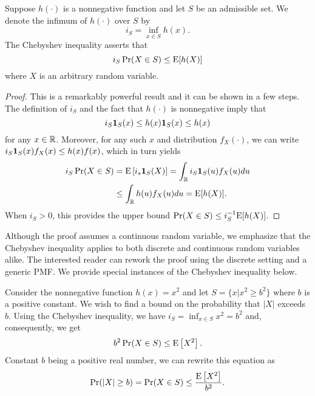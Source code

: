 \begin{proposition}
Suppose $h (\cdot)$ is a nonnegative function and let $S$ be an admissible set.
We denote the infimum of $h (\cdot)$ over $S$ by
\begin{equation*}
i_S = \inf_{ x \in S } h (x) .
\end{equation*}
The Chebyshev inequality asserts that
\begin{equation} \label{equation:ChebyshevInequality}
i_S \Pr (X \in S)
\leq \mathrm{E} [ h(X) ]
\end{equation}
where $X$ is an arbitrary random variable.
\end{proposition}
\begin{proof}
This is a remarkably powerful result and it can be shown in a few steps.
The definition of $i_S$ and the fact that $h (\cdot)$ is nonnegative imply that
\begin{equation*}
i_S \mathbf{1}_S (x) \leq h(x) \mathbf{1}_S (x) \leq h(x)
\end{equation*}
for any $x \in \mathbb{R}$.
Moreover, for any such $x$ and distribution $f_X(\cdot)$, we can write $i_S \mathbf{1}_S (x) f_X(x) \leq h(x) f(x)$, which in turn yields
\begin{equation*}
\begin{split}
i_S \Pr (X \in S) &= \mathrm{E} \left[ i_s \mathbf{1}_S (X) \right]
= \int_{\mathbb{R}} i_S \mathbf{1}_S (u) f_X(u) du \\
&\leq \int_{\mathbb{R}} h (u) f_X(u) du
= \mathrm{E} [ h(X) ] .
\end{split}
\end{equation*}
When $i_S > 0$, this provides the upper bound $\Pr (X \in S) \leq i_S^{-1} \mathrm{E} [h (X)]$.
\end{proof}

Although the proof assumes a continuous random variable, we emphasize that the Chebyshev inequality applies to both discrete and continuous random variables alike.
The interested reader can rework the proof using the discrete setting and a generic PMF.
We provide special instances of the Chebyshev inequality below.

\begin{example}
Consider the nonnegative function $h(x) = x^2$ and let $S = \{ x | x^2 \geq b^2 \}$ where $b$ is a positive constant.
We wish to find a bound on the probability that $|X|$ exceeds $b$.
Using the Chebyshev inequality, we have $i_S = \inf_{x \in S} x^2 = b^2$ and, consequently, we get
\begin{equation*}
b^2 \Pr (X \in S) \leq \mathrm{E} \left[ X^2 \right] .
\end{equation*}
Constant $b$ being a positive real number, we can rewrite this equation as
\begin{equation*}
\Pr (|X| \geq b) = \Pr (X \in S) \leq \frac{\mathrm{E} \left[ X^2 \right]}{b^2} .
\end{equation*}
\end{example}

